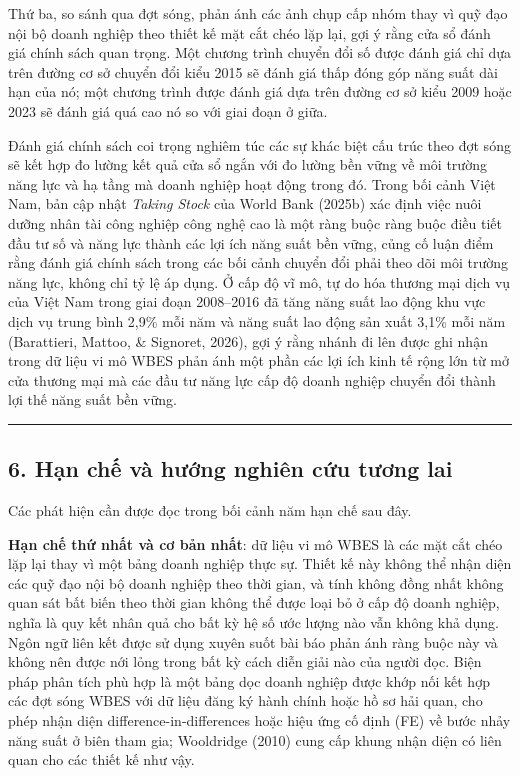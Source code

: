 \documentclass[12pt,a4paper]{article}
\begin{document}
Thứ ba, so sánh qua đợt sóng, phản ánh các ảnh chụp cấp nhóm thay vì quỹ
đạo nội bộ doanh nghiệp theo thiết kế mặt cắt chéo lặp lại, gợi ý rằng
cửa sổ đánh giá chính sách quan trọng. Một chương trình chuyển đổi số
được đánh giá chỉ dựa trên đường cơ sở chuyển đổi kiểu 2015 sẽ đánh giá
thấp đóng góp năng suất dài hạn của nó; một chương trình được đánh giá
dựa trên đường cơ sở kiểu 2009 hoặc 2023 sẽ đánh giá quá cao nó so với
giai đoạn ở giữa.

Đánh giá chính sách coi trọng nghiêm túc các sự khác biệt cấu trúc theo
đợt sóng sẽ kết hợp đo lường kết quả cửa sổ ngắn với đo lường bền vững
về môi trường năng lực và hạ tầng mà doanh nghiệp hoạt động trong đó.
Trong bối cảnh Việt Nam, bản cập nhật \emph{Taking Stock} của World Bank
(2025b) xác định việc nuôi dưỡng nhân tài công nghiệp công nghệ cao là
một ràng buộc ràng buộc điều tiết đầu tư số và năng lực thành các lợi
ích năng suất bền vững, củng cố luận điểm rằng đánh giá chính sách trong
các bối cảnh chuyển đổi phải theo dõi môi trường năng lực, không chỉ tỷ
lệ áp dụng. Ở cấp độ vĩ mô, tự do hóa thương mại dịch vụ của Việt Nam
trong giai đoạn 2008--2016 đã tăng năng suất lao động khu vực dịch vụ
trung bình 2,9\% mỗi năm và năng suất lao động sản xuất 3,1\% mỗi năm
(Barattieri, Mattoo, \& Signoret, 2026), gợi ý rằng nhánh đi lên được
ghi nhận trong dữ liệu vi mô WBES phản ánh một phần các lợi ích kinh tế
rộng lớn từ mở cửa thương mại mà các đầu tư năng lực cấp độ doanh nghiệp
chuyển đổi thành lợi thế năng suất bền vững.

\begin{center}\rule{0.5\linewidth}{0.5pt}\end{center}

\hypertarget{6-hux1ea1n-chux1ebf-vuxe0-hux1b0ux1edbng-nghiuxean-cux1ee9u-tux1b0ux1a1ng-lai}{%
\subsection{6. Hạn chế và hướng nghiên cứu tương
lai}\label{6-hux1ea1n-chux1ebf-vuxe0-hux1b0ux1edbng-nghiuxean-cux1ee9u-tux1b0ux1a1ng-lai}}

Các phát hiện cần được đọc trong bối cảnh năm hạn chế sau đây.

\textbf{Hạn chế thứ nhất và cơ bản nhất}: dữ liệu vi mô WBES là các mặt
cắt chéo lặp lại thay vì một bảng doanh nghiệp thực sự. Thiết kế này
không thể nhận diện các quỹ đạo nội bộ doanh nghiệp theo thời gian, và
tính không đồng nhất không quan sát bất biến theo thời gian không thể
được loại bỏ ở cấp độ doanh nghiệp, nghĩa là quy kết nhân quả cho bất kỳ
hệ số ước lượng nào vẫn không khả dụng. Ngôn ngữ liên kết được sử dụng
xuyên suốt bài báo phản ánh ràng buộc này và không nên được nới lỏng
trong bất kỳ cách diễn giải nào của người đọc. Biện pháp phân tích phù
hợp là một bảng dọc doanh nghiệp được khớp nối kết hợp các đợt sóng WBES
với dữ liệu đăng ký hành chính hoặc hồ sơ hải quan, cho phép nhận diện
difference-in-differences hoặc hiệu ứng cố định (FE) về bước nhảy năng
suất ở biên tham gia; Wooldridge (2010) cung cấp khung nhận diện có liên
quan cho các thiết kế như vậy.
\end{document}
